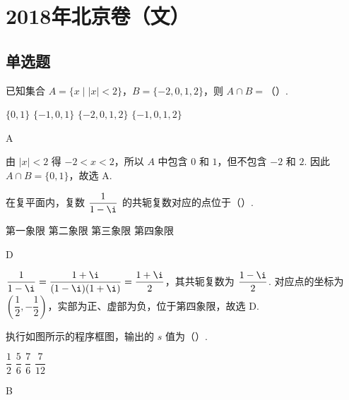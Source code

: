 \chapter{2018年北京卷（文）}

\section{单选题}

\begin{problem}
已知集合 \(A=\{x\mid \lvert x\rvert<2\}\)，\(B=\{-2,0,1,2\}\)，则 \(A\cap B=\)（\quad）.

\choices
    {\(\{0,1\}\)}
    {\(\{-1,0,1\}\)}
    {\(\{-2,0,1,2\}\)}
    {\(\{-1,0,1,2\}\)}
\end{problem}

\begin{answer}
A
\end{answer}

\begin{solution}
由 \(\lvert x\rvert<2\) 得 \(-2<x<2\)，所以 \(A\) 中包含 \(0\) 和 \(1\)，但不包含 \(-2\) 和 \(2\). 因此 \(A\cap B=\{0,1\}\)，故选 A.
\end{solution}

\begin{problem}
在复平面内，复数 \(\dfrac1{1-\i}\) 的共轭复数对应的点位于（\quad）.

\choices
    {第一象限}
    {第二象限}
    {第三象限}
    {第四象限}
\end{problem}

\begin{answer}
D
\end{answer}

\begin{solution}
\(\displaystyle \frac{1}{1-\i}=\frac{1+\i}{(1-\i)(1+\i)}=\frac{1+\i}{2}\)，其共轭复数为 \(\displaystyle \frac{1-\i}{2}\). 对应点的坐标为 \(\left(\dfrac12,-\dfrac12\right)\)，实部为正、虚部为负，位于第四象限，故选 D.
\end{solution}


\begin{problem}
执行如图所示的程序框图，输出的 \(s\) 值为（\quad）.


\choices
    {\(\dfrac12\)}
    {\(\dfrac56\)}
    {\(\dfrac76\)}
    {\(\dfrac7{12}\)}
\end{problem}

\begin{answer}
B
\end{answer}

